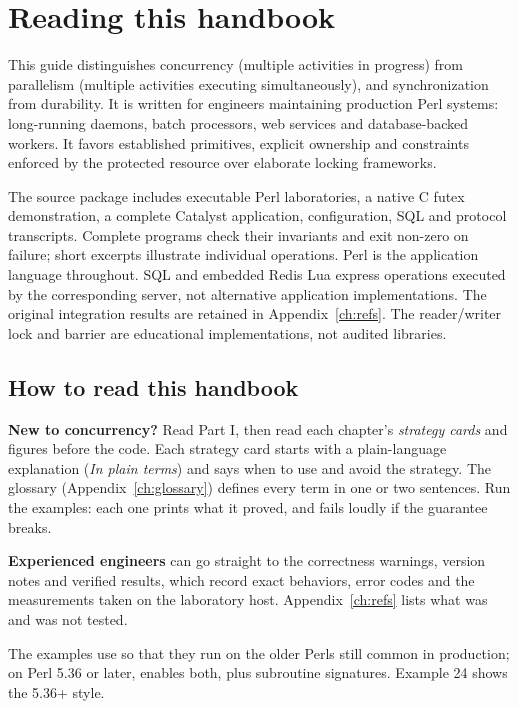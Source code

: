 \documentclass[11pt,openany]{book}
\makeatletter
\DeclareRobustCommand{\code}[1]{\texttt{\expandafter\code@quotes\expandafter{\detokenize{#1}}}}
\newcommand{\code@quotes}[1]{\saveexpandmode\expandarg
  \StrSubstitute{#1}{'}{\noexpand\textquotesingle}[\code@tmp]%
  \StrSubstitute{\code@tmp}{`}{\noexpand\textasciigrave}[\code@tmp]%
  \StrSubstitute{\code@tmp}{::}{::\noexpand\allowbreak}[\code@tmp]%
  \restoreexpandmode\code@tmp}
\makeatother
\begin{document}
\chapter*{Reading this handbook}
This guide distinguishes concurrency (multiple activities in progress) from parallelism (multiple activities executing simultaneously), and synchronization from durability. It is written for engineers maintaining production Perl systems: long-running daemons, batch processors, web services and database-backed workers. It favors established primitives, explicit ownership and constraints enforced by the protected resource over elaborate locking frameworks.

The source package includes executable Perl laboratories, a native C futex demonstration, a complete Catalyst application, configuration, SQL and protocol transcripts. Complete programs check their invariants and exit non-zero on failure; short excerpts illustrate individual operations. Perl is the application language throughout. SQL and embedded Redis Lua express operations executed by the corresponding server, not alternative application implementations. The original integration results are retained in Appendix~\ref{ch:refs}. The reader/writer lock and barrier are educational implementations, not audited libraries.

\section*{How to read this handbook}
\textbf{New to concurrency?} Read Part I, then read each chapter's \emph{strategy cards} and figures before the code. Each strategy card starts with a plain-language explanation (\emph{In plain terms}) and says when to use and avoid the strategy. The glossary (Appendix~\ref{ch:glossary}) defines every term in one or two sentences. Run the examples: each one prints what it proved, and fails loudly if the guarantee breaks.

\textbf{Experienced engineers} can go straight to the correctness warnings, version notes and verified results, which record exact behaviors, error codes and the measurements taken on the laboratory host. Appendix~\ref{ch:refs} lists what was and was not tested.

The examples use \code{use strict; use warnings;} so that they run on the older Perls still common in production; on Perl 5.36 or later, \code{use v5.36} enables both, plus subroutine signatures. Example 24 shows the 5.36+ style.
\end{document}
